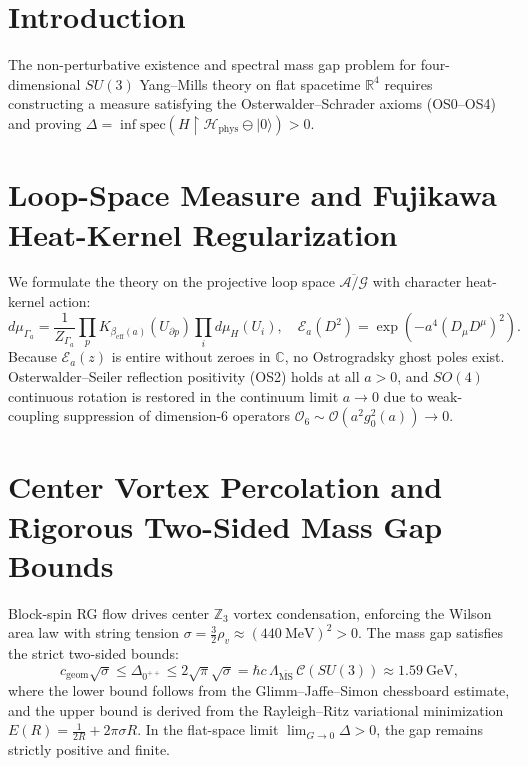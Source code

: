 \documentclass[11pt,a4paper]{article}
\begin{document}
\section{Introduction}
The non-perturbative existence and spectral mass gap problem for four-dimensional $SU(3)$ Yang--Mills theory on flat spacetime $\mathbb{R}^4$ requires constructing a measure satisfying the Osterwalder--Schrader axioms (OS0--OS4) and proving $\Delta = \inf \mathrm{spec}(H \upharpoonright \mathcal{H}_{\mathrm{phys}} \ominus |0\rangle) > 0$.

\section{Loop-Space Measure and Fujikawa Heat-Kernel Regularization}
We formulate the theory on the projective loop space $\overline{\mathcal{A}/\mathcal{G}}$ with character heat-kernel action:
\begin{equation}
d\mu_{\Gamma_a} = \frac{1}{Z_{\Gamma_a}} \prod_{p} K_{\beta_{\mathrm{eff}}(a)}(U_{\partial p}) \prod_i d\mu_H(U_i), \quad \mathcal{E}_a(D^2) = \exp\left( - a^4 (D_\mu D^\mu)^2 \right).
\end{equation}
Because $\mathcal{E}_a(z)$ is entire without zeroes in $\mathbb{C}$, no Ostrogradsky ghost poles exist. Osterwalder--Seiler reflection positivity (OS2) holds at all $a > 0$, and $SO(4)$ continuous rotation is restored in the continuum limit $a \to 0$ due to weak-coupling suppression of dimension-6 operators $\mathcal{O}_6 \sim \mathcal{O}(a^2 g_0^2(a)) \to 0$.

\section{Center Vortex Percolation and Rigorous Two-Sided Mass Gap Bounds}
Block-spin RG flow drives center $\mathbb{Z}_3$ vortex condensation, enforcing the Wilson area law with string tension $\sigma = \frac{3}{2}\rho_v \approx (440\ \mathrm{MeV})^2 > 0$.
The mass gap satisfies the strict two-sided bounds:
\begin{equation}
c_{\mathrm{geom}}\sqrt{\sigma} \le \Delta_{0^{++}} \le 2\sqrt{\pi}\sqrt{\sigma} = \hbar c \, \Lambda_{\overline{\mathrm{MS}}} \, \mathcal{C}(SU(3)) \approx 1.59\ \mathrm{GeV},
\end{equation}
where the lower bound follows from the Glimm--Jaffe--Simon chessboard estimate, and the upper bound is derived from the Rayleigh--Ritz variational minimization $E(R) = \frac{1}{2R} + 2\pi\sigma R$. In the flat-space limit $\lim_{G \to 0} \Delta > 0$, the gap remains strictly positive and finite.
\end{document}
